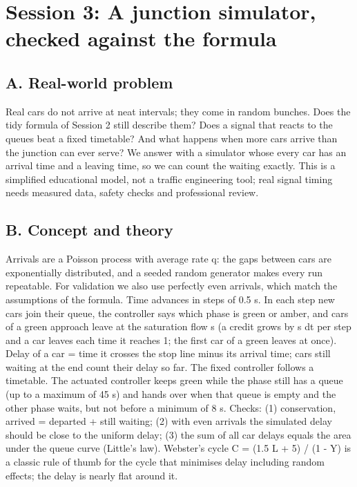 \documentclass[11pt,a4paper]{article}
\begin{document}
\section{Session 3: A junction simulator, checked against the formula}

\subsection*{A. Real-world problem}
Real cars do not arrive at neat intervals; they come in random bunches. Does the tidy formula of Session 2 still describe them? Does a signal that reacts to the queues beat a fixed timetable? And what happens when more cars arrive than the junction can ever serve? We answer with a simulator whose every car has an arrival time and a leaving time, so we can count the waiting exactly. This is a simplified educational model, not a traffic engineering tool; real signal timing needs measured data, safety checks and professional review.

\subsection*{B. Concept and theory}
Arrivals are a Poisson process with average rate q: the gaps between cars are exponentially distributed, and a seeded random generator makes every run repeatable. For validation we also use perfectly even arrivals, which match the assumptions of the formula. Time advances in steps of 0.5 s. In each step new cars join their queue, the controller says which phase is green or amber, and cars of a green approach leave at the saturation flow s (a credit grows by s dt per step and a car leaves each time it reaches 1; the first car of a green leaves at once). Delay of a car = time it crosses the stop line minus its arrival time; cars still waiting at the end count their delay so far. The fixed controller follows a timetable. The actuated controller keeps green while the phase still has a queue (up to a maximum of 45 s) and hands over when that queue is empty and the other phase waits, but not before a minimum of 8 s. Checks: (1) conservation, arrived = departed + still waiting; (2) with even arrivals the simulated delay should be close to the uniform delay; (3) the sum of all car delays equals the area under the queue curve (Little's law). Webster's cycle C = (1.5 L + 5) / (1 - Y) is a classic rule of thumb for the cycle that minimises delay including random effects; the delay is nearly flat around it.
\end{document}
